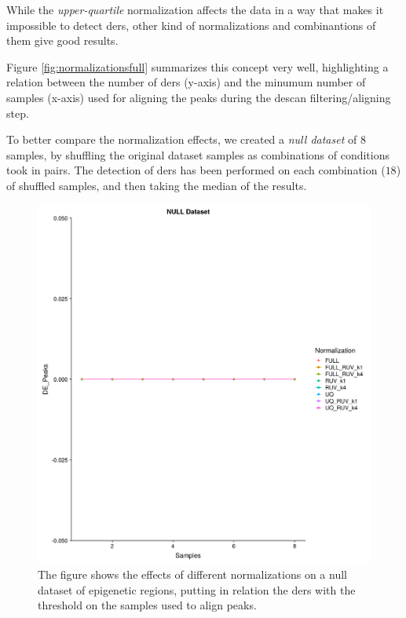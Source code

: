 While the \textit{upper-quartile} normalization affects the data in a way that makes it impossible to detect \glspl{der}, other kind of normalizations and combinantions of them give good results.

Figure \ref{fig:normalizationsfull} summarizes this concept very well, highlighting a relation between the number of \glspl{der} (y-axis) and the minumum number of samples (x-axis) used for aligning the peaks during the \gls{descan} filtering/aligning step.

To better compare the normalization effects, we created a \textit{null dataset} of 8 samples, by shuffling the original dataset samples as combinations of conditions took in pairs.
The detection of \glspl{der} has been performed on each combination ($18$) of shuffled samples, and then taking the median of the results.

\begin{figure}[H]
\centering
\includegraphics[width=\textwidth, keepaspectratio]{img/descan2/null_dataset_final.pdf}
\caption[Normalizations applied to null dataset]{The figure shows the effects of different normalizations on a null dataset of epigenetic regions, putting in relation the \glspl{der} with the threshold on the samples used to align peaks.}
\label{fig:normalizationsnull}
\centering
\end{figure}

